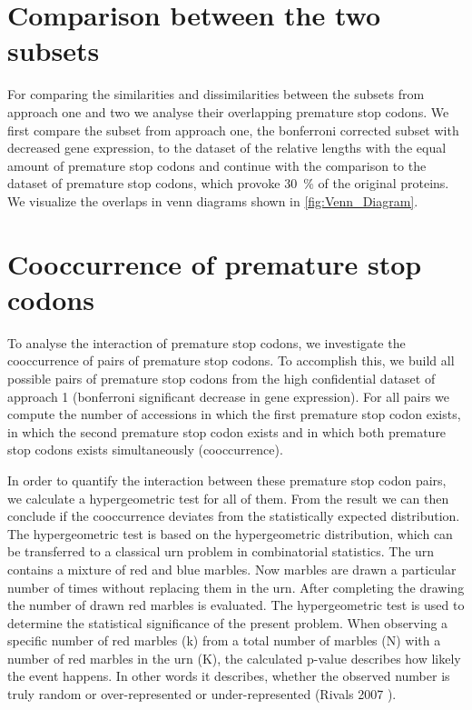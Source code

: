 \section{Comparison between the two subsets}
For comparing the similarities and dissimilarities between the subsets from approach one and two we analyse their overlapping premature stop codons. We first compare the subset from approach one, the bonferroni corrected subset with decreased gene expression, to  the dataset of the relative lengths with the equal amount of premature stop codons and continue with the comparison to the dataset of premature stop codons, which provoke \SI{30}{\percent} of the original proteins. We visualize the overlaps in venn diagrams shown in \autoref{fig:Venn_Diagram}. 
\section{Cooccurrence of premature stop codons}
\label{sec:Methods_Coocurrence}
To analyse the interaction of premature stop codons, we investigate the cooccurrence of pairs of premature stop codons. To accomplish this, we build all possible pairs of premature stop codons from the high confidential dataset of approach 1 (bonferroni significant decrease in gene expression). For all pairs we compute the number of accessions in which the first premature stop codon exists, in which the second premature stop codon exists and in which both premature stop codons exists simultaneously (cooccurrence). 

In order to quantify the interaction between these premature stop codon pairs, we calculate a hypergeometric test for all of them. From the result we can then conclude if the cooccurrence deviates from the statistically expected distribution. The hypergeometric test is based on the hypergeometric distribution, which can be transferred to a classical urn problem in combinatorial statistics. The urn contains a mixture of red and blue marbles. Now marbles are drawn a particular number of times without replacing them in the urn. After completing the drawing the number of drawn red marbles is evaluated. The hypergeometric test is used to determine the statistical significance of the present problem. When observing a specific number of red marbles (k) from a total number of marbles (N) with a number of red marbles in the urn (K), the calculated p-value describes how likely the event happens. In other words it describes, whether the observed number is truly random or over-represented or under-represented (Rivals 2007 \cite{rivals2007}). 

